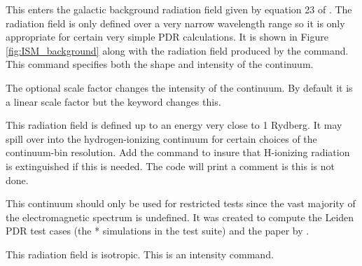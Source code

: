 This enters the galactic background radiation field given by
equation 23 of \citet{Draine1996}.
The radiation field is only defined over a very
narrow wavelength range so it is only appropriate for
certain very simple PDR calculations.
It is shown in Figure \ref{fig:ISM_background} along with the
radiation field produced
by the  command.
This command specifies both the shape and
intensity of the continuum.

The optional scale factor changes the intensity
of the continuum.
By default it is a linear scale factor but the keyword  changes this.

This radiation field is defined up to an energy very close to 1 Rydberg.
It may spill over into the hydrogen-ionizing continuum for certain
choices of the continuum-bin resolution.
Add the  command to insure that
H-ionizing radiation is extinguished if this is needed.
The code will print a comment is this is not done.

This continuum should only be used for restricted tests since the vast
majority of the electromagnetic spectrum is undefined.
It was created to compute the Leiden PDR test cases
(the * simulations in the test
suite) and the paper by \citet{Roellig2007}.

This radiation field is isotropic.
This is an intensity command.

